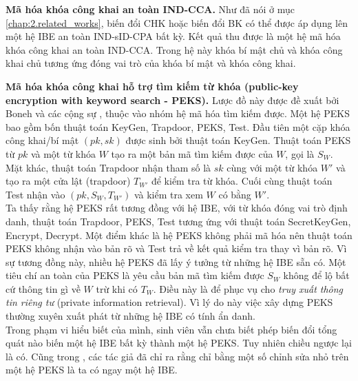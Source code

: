 \documentclass[class=report, crop=false]{standalone}
\begin{document}
			\noindent
			\textbf{Mã hóa khóa công khai an toàn IND-CCA.}\hspace{1ex}
			Như đã nói ở mục \ref{chap:2.related_works}, biến đổi CHK hoặc biến đổi BK có thể được áp dụng lên một hệ IBE an toàn IND-sID-CPA bất kỳ. Kết quả thu được là một hệ mã hóa khóa công khai an toàn IND-CCA. Trong hệ này khóa bí mật chủ và khóa công khai chủ tương ứng đóng vai trò của khóa bí mật và khóa công khai.

			\noindent
			\textbf{Mã hóa khóa công khai hỗ trợ tìm kiếm từ khóa (public-key encryption with keyword search - PEKS).}\hspace{1ex}
			Lược đồ này được đề xuất bởi Boneh và các cộng sự \cite{DBLP:conf/eurocrypt/BonehCOP04}, thuộc vào nhóm hệ mã hóa tìm kiếm được. Một hệ PEKS bao gồm bốn thuật toán \textsf{KeyGen, Trapdoor, PEKS, Test}. Đầu tiên một cặp khóa công khai/bí mật $(pk, sk)$ được sinh bởi thuật toán \textsf{KeyGen}. Thuật toán \textsf{PEKS} từ $pk$ và một từ khóa $W$ tạo ra một bản mã tìm kiếm được của $W$, gọi là $S_W$. Mặt khác, thuật toán \textsf{Trapdoor} nhận tham số là $sk$ cùng với một từ khóa $W'$ và tạo ra một cửa lật (trapdoor) $T_{W'}$ để kiểm tra từ khóa. Cuối cùng thuật toán \textsf{Test} nhận vào $(pk, S_W, T_{W'})$ và kiểm tra xem $W$ có bằng $W'$. \\ \indent
			Ta thấy rằng hệ PEKS rất tương đồng với hệ IBE, với từ khóa đóng vai trò định danh, thuật toán \textsf{Trapdoor, PEKS, Test} tương ứng với thuật toán \textsf{SecretKeyGen, Encrypt, Decrypt}. Một điểm khác là hệ PEKS không phải mã hóa nên thuật toán \textsf{PEKS} không nhận vào bản rõ và \textsf{Test} trả về kết quả kiểm tra thay vì bản rõ. Vì sự tương đồng này, nhiều hệ PEKS đã lấy ý tưởng từ những hệ IBE sẵn có. Một tiêu chí an toàn của PEKS là yêu cầu bản mã tìm kiếm được $S_W$ không để lộ bất cứ thông tin gì về $W$ trừ khi có $T_W$. Điều này là để phục vụ cho \textit{truy xuất thông tin riêng tư} (private information retrieval). Vì lý do này việc xây dựng PEKS thường xuyên xuất phát từ những hệ IBE có tính ẩn danh. \\ \indent
			Trong phạm vi hiểu biết của mình, sinh viên vẫn chưa biết phép biến đổi tổng quát nào biến một hệ IBE bất kỳ thành một hệ PEKS. Tuy nhiên chiều ngược lại là có. Cũng trong \cite{DBLP:conf/eurocrypt/BonehCOP04}, các tác giả đã chỉ ra rằng chỉ bằng một số chỉnh sửa nhỏ trên một hệ PEKS là ta có ngay một hệ IBE.
\end{document}
